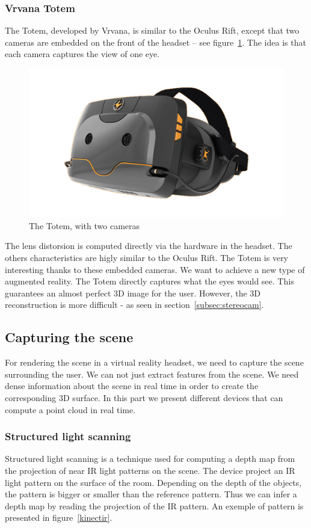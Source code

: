 \documentclass[12pt]{article}
\begin{document}
\subsubsection{Vrvana Totem}
The Totem, developed by Vrvana, is similar to the Oculus Rift, except that two cameras are embedded on the front of the headset -- see figure~\ref{tpg}. The idea is that each camera captures the view of one eye.

\begin{figure}[h]
  \centering
  \includegraphics[scale=0.3]{TruePlayerGear.jpg}
  \caption{\label{tpg} The Totem, with two cameras}
\end{figure}

The lens distorsion is computed directly via the hardware in the headset. The others characteristics are higly similar to the Oculus Rift. The Totem is very interesting thanks to these embedded cameras. We want to achieve a new type of augmented reality. The Totem directly captures what the eyes would see. This guarantees an almost perfect 3D image for the user. However, the 3D reconstruction is more difficult - as seen in section~\ref{subsec:stereocam}.

\subsection{Capturing the scene}
For rendering the scene in a virtual reality headset, we need to capture the scene surrounding the user. We can not just extract features from the scene. We need dense information about the scene in real time in order to create the corresponding 3D surface. In this part we present different devices that can compute a point cloud in real time.

\subsubsection{Structured light scanning}
Structured light scanning is a technique used for computing a depth map from the projection of near IR light patterns on the scene. The device project an IR light pattern on the surface of the room. Depending on the depth of the objects, the pattern is bigger or smaller than the reference pattern. Thus we can infer a depth map by reading the projection of the IR pattern. An exemple of pattern is presented in figure~\ref{kinectir}.
\end{document}
